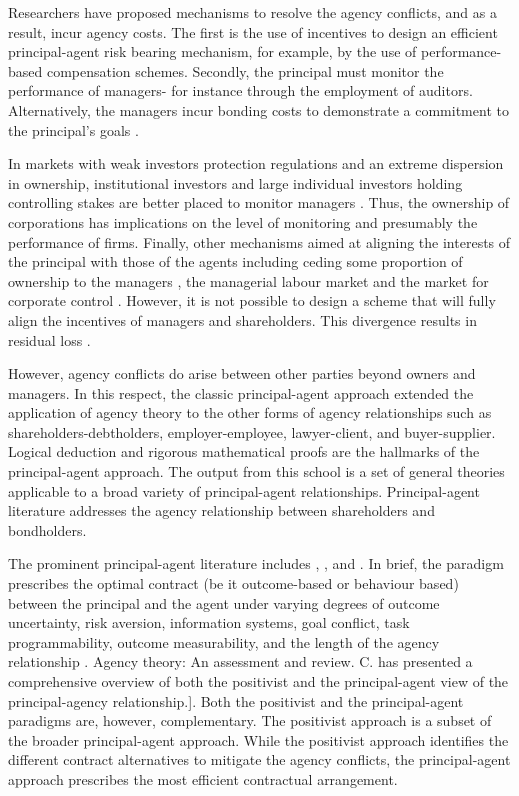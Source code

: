 \documentclass[a4paper, nobind]{templates/ociamthesis}
\begin{document}
Researchers have proposed mechanisms to resolve the agency conflicts, and as a result, incur agency costs. The first is the use of incentives to design an efficient principal-agent risk bearing mechanism, for example, by the use of performance-based compensation schemes. Secondly, the principal must monitor the performance of managers- for instance through the employment of auditors. Alternatively, the managers incur bonding costs to demonstrate a commitment to the principal's goals \autocite{bosse2016agency}.

In markets with weak investors protection regulations and an extreme dispersion in ownership, institutional investors and large individual investors holding controlling stakes are better placed to monitor managers \autocite{goergen2003levels}. Thus, the ownership of corporations has implications on the level of monitoring and presumably the performance of firms. Finally, other mechanisms aimed at aligning the interests of the principal with those of the agents including ceding some proportion of ownership to the managers \autocite{ang2000agency}, the managerial labour market and the market for corporate control \autocite{ballwieser2012agency}. However, it is not possible to design a scheme that will fully align the incentives of managers and shareholders. This divergence results in residual loss \autocite{fama1983agency}.

However, agency conflicts do arise between other parties beyond owners and managers. In this respect, the classic principal-agent approach extended the application of agency theory to the other forms of agency relationships such as shareholders-debtholders, employer-employee, lawyer-client, and buyer-supplier. Logical deduction and rigorous mathematical proofs are the hallmarks of the principal-agent approach. The output from this school is a set of general theories applicable to a broad variety of principal-agent relationships. Principal-agent literature addresses the agency relationship between shareholders and bondholders.

The prominent principal-agent literature includes \textcite{demski1978economic}, \textcite{eisenhardt1985control}, and \textcite{eisenhardt1988agency}. In brief, the paradigm prescribes the optimal contract (be it outcome-based or behaviour based) between the principal and the agent under varying degrees of outcome uncertainty, risk aversion, information systems, goal conflict, task programmability, outcome measurability, and the length of the agency relationship \autocite{eisenhardt1989agency}. Agency theory: An assessment and review. C. has presented a comprehensive overview of both the positivist and the principal-agent view of the principal-agency relationship.{]}. Both the positivist and the principal-agent paradigms are, however, complementary. The positivist approach is a subset of the broader principal-agent approach. While the positivist approach identifies the different contract alternatives to mitigate the agency conflicts, the principal-agent approach prescribes the most efficient contractual arrangement.
\end{document}
